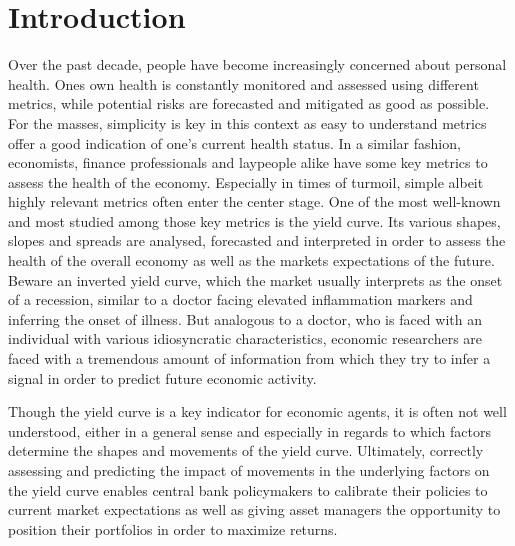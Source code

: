 \section{Introduction}
\label{sec:intro}

Over the past decade, people have become increasingly concerned about personal health. 
Ones own health is constantly monitored and assessed using different metrics, while potential risks are forecasted and mitigated as good as possible. 
For the masses, simplicity is key in this context as easy to understand metrics offer a good indication of one’s current health status. 
In a similar fashion, economists, finance professionals and laypeople alike have some key metrics to assess the health of the economy. 
Especially in times of turmoil, simple albeit highly relevant metrics often enter the center stage. 
One of the most well-known and most studied among those key metrics is the yield curve. 
Its various shapes, slopes and spreads are analysed, forecasted and interpreted in order to assess the health of the overall economy as well as the markets expectations of the future.
Beware an inverted yield curve, which the market usually interprets as the onset of a recession, similar to a doctor facing elevated inflammation markers and inferring the onset of illness. 
But analogous to a doctor, who is faced with an individual with various idiosyncratic characteristics, economic researchers are faced with a tremendous amount of information from which they try to infer a signal in order to predict future economic activity. 

Though the yield curve is a key indicator for economic agents, it is often not well understood, either in a general sense and especially in regards to which factors determine the shapes and movements of the yield curve. 
Ultimately, correctly assessing and predicting the impact of movements in the underlying factors on the yield curve enables central bank policymakers to calibrate their policies to current market expectations as well as giving asset managers the opportunity to position their portfolios in order to maximize returns. 

